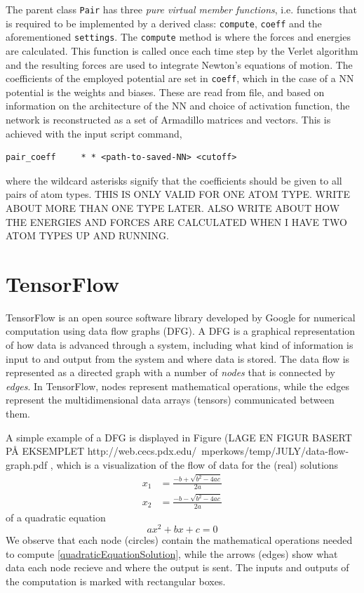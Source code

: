 \documentclass[twoside,english]{uiofysmaster}
\begin{document}
The parent class \texttt{Pair} has three \textit{pure virtual member functions}, i.e. functions that is required
to be implemented by a derived class: \texttt{compute}, \texttt{coeff} and the aforementioned \texttt{settings}. 
The \texttt{compute} method is where the forces and energies are calculated. This function is called
once each time step by the Verlet algorithm and the resulting forces are used to integrate Newton's equations
of motion. The coefficients of the employed potential are set in \texttt{coeff}, which in the case of a NN potential
is the weights and biases. These are read from file, and based on information on the architecture of the NN and 
choice of activation function, the network is reconstructed as a set of Armadillo matrices and 
vectors. This is achieved with the input script command,
\begin{lstlisting}[style=lammps]
 pair_coeff		* * <path-to-saved-NN> <cutoff> 
\end{lstlisting}
where the wildcard asterisks signify that the coefficients should be given to all pairs of atom types. 
THIS IS ONLY VALID FOR ONE ATOM TYPE. WRITE ABOUT MORE THAN ONE TYPE LATER. ALSO WRITE ABOUT
HOW THE ENERGIES AND FORCES ARE CALCULATED WHEN I HAVE TWO ATOM TYPES
UP AND RUNNING.





\chapter{TensorFlow}
TensorFlow \cite{Abadi15} \cite{Abadi16} is an open source software library 
developed by Google 
for numerical computation using data flow graphs (DFG). 
A DFG is a graphical representation of how data is
advanced through a system, including what kind of information is input
to and output from the system and where data is stored.
The data flow is represented as a directed graph
with a number of \textit{nodes} that is connected by
\textit{edges}. In TensorFlow, nodes represent
mathematical operations, while the edges represent
the multidimensional data arrays (tensors) 
communicated between them.

A simple example of a DFG is displayed in Figure (LAGE
EN FIGUR BASERT PÅ EKSEMPLET 
http://web.cecs.pdx.edu/~mperkows/temp/JULY/data-flow-graph.pdf
, which is a visualization of the flow of data
for the (real) solutions 
\begin{align}
 x_1 &= \frac{-b + \sqrt{b^2 - 4ac}}{2a} \\
 x_2 &= \frac{-b - \sqrt{b^2 - 4ac}}{2a}
 \label{quadraticEquationSolution}
\end{align}
of a quadratic equation
\begin{equation}
 ax^2 + bx + c = 0
\end{equation}
We observe that each node (circles)
contain the mathematical operations needed to compute
\eqref{quadraticEquationSolution}, while the arrows
(edges) show what data each node recieve and where
the output is sent. The inputs and outputs
of the computation is marked with rectangular
boxes. 
\end{document}
